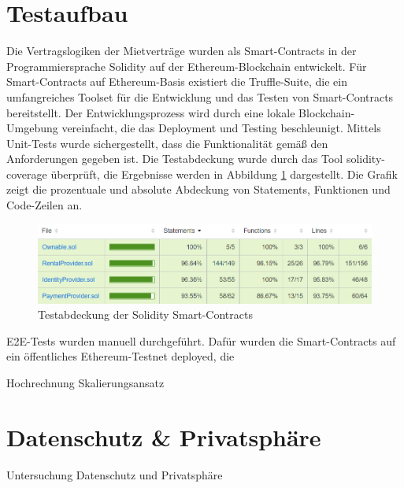 \section{Testaufbau}
\label{subsec:implementation:poc:testing}
Die Vertragslogiken der Mietverträge wurden als Smart-Contracts in der Programmiersprache Solidity auf der Ethereum-Blockchain entwickelt. Für Smart-Contracts auf Ethereum-Basis existiert die Truffle-Suite, die ein umfangreiches Toolset für die Entwicklung und das Testen von Smart-Contracts bereitstellt. Der Entwicklungsprozess wird durch eine lokale Blockchain-Umgebung vereinfacht, die das Deployment und Testing beschleunigt. Mittels Unit-Tests wurde sichergestellt, dass die Funktionalität gemäß den Anforderungen gegeben ist. Die Testabdeckung wurde durch das Tool solidity-coverage überprüft, die Ergebnisse werden in Abbildung \ref{fig:chapter07:coverage} dargestellt. Die Grafik zeigt die prozentuale und absolute Abdeckung von Statements, Funktionen und Code-Zeilen an.

\begin{figure}[h]
 \centering
 \includegraphics[width=1.0\textwidth]{gfx/coverage.png}
 \caption{Testabdeckung der Solidity Smart-Contracts}
 \label{fig:chapter07:coverage}
\end{figure}

\ac{E2E}-Tests wurden manuell durchgeführt. Dafür wurden die Smart-Contracts auf ein öffentliches Ethereum-Testnet deployed, die


Hochrechnung Skalierungsansatz

\section{Datenschutz \& Privatsphäre}
\label{subsec:implementation:poc:privacy}
Untersuchung Datenschutz und Privatsphäre
